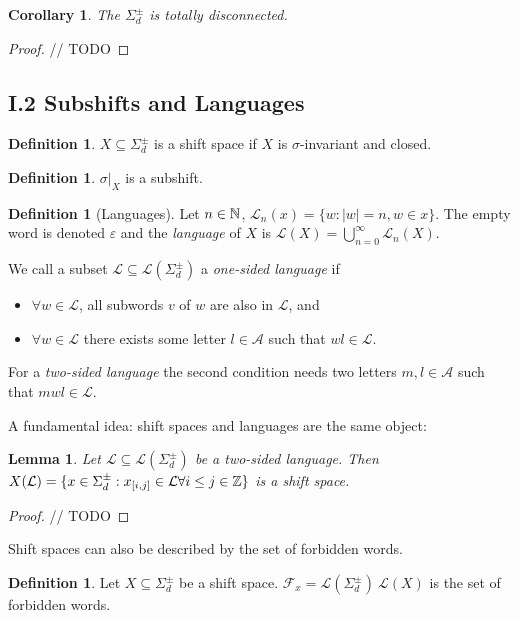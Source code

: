 \documentclass[11pt, reqno]{amsart}
\theoremstyle{plain}
\numberwithin{thm}{subsection}
\newtheorem{lemma}[thm]{Lemma}
\newtheorem{cor}[thm]{Corollary}
\theoremstyle{definition}
\newtheorem{defn}[thm]{Definition}
\def\cA{\mathcal{A}}\def\cB{\mathcal{B}}\def\cC{\mathcal{C}}\def\cD{\mathcal{D}}\def\cE{\mathcal{E}}\def\cF{\mathcal{F}}\def\cG{\mathcal{G}}\def\cH{\mathcal{H}}\def\cI{\mathcal{I}}\def\cJ{\mathcal{J}}\def\cK{\mathcal{K}}\def\cL{\mathcal{L}}\def\cM{\mathcal{M}}\def\cN{\mathcal{N}}\def\cO{\mathcal{O}}\def\cP{\mathcal{P}}\def\cQ{\mathcal{Q}}\def\cR{\mathcal{R}}\def\cS{\mathcal{S}}\def\cT{\mathcal{T}}\def\cU{\mathcal{U}}\def\cV{\mathcal{V}}\def\cW{\mathcal{W}}\def\cX{\mathcal{X}}\def\cY{\mathcal{Y}}\def\cZ{\mathcal{Z}}
\def\tsfs{\Sigma^{\pm}_d}
\begin{document}
\begin{cor}
    The $\tsfs$ is totally disconnected.  
\end{cor}
\begin{proof}
    // TODO
\end{proof}

\subsection*{I.2 Subshifts and Languages}
\begin{defn}
    $X \subseteq \tsfs$ is a shift space if $X$ is $\sigma$-invariant and closed.
\end{defn}

\begin{defn}
    $\sigma|_{X}$ is a subshift.
\end{defn}

\begin{defn}[Languages]
    Let $n \in \mathbb{N}$, $\cL_n(x) = \{w : |w| = n, w \in x\}$. The empty word is denoted $\varepsilon$ and the \textit{language} of $X$ is $\cL(X) = \bigcup_{n=0}^\infty \cL_n(X).$

    We call a subset $\cL \subseteq \cL(\tsfs)$ a \textit{one-sided language} if 
    \begin{itemize}
        \item $\forall w \in \cL$, all subwords $v$ of $w$ are also in $\cL$, and 
        \item $\forall w \in \cL$ there exists some letter $l \in \cA$ such that $wl \in \cL$.
    \end{itemize}

    For a \textit{two-sided language} the second condition needs two letters $ m, l \in \cA$ such that $mwl \in \cL$.
\end{defn}

A fundamental idea: shift spaces and languages are the same object:

\begin{lemma}
    Let $\cL \subseteq \cL (\tsfs)$ be a two-sided language. Then $X(\cL) = \{x \in \tsfs : x_{[i,j]} \in \cL \forall i\leq j \in \ZZ\}$ is a shift space. 
\end{lemma}

\begin{proof}
    // TODO
\end{proof}

Shift spaces can also be described by the set of forbidden words. 

\begin{defn} Let $X \subseteq \tsfs$ be a shift space. $\cF_x = \cL(\tsfs) \ \cL(X)$ is the set of forbidden words.
\end{defn}
\end{document}
